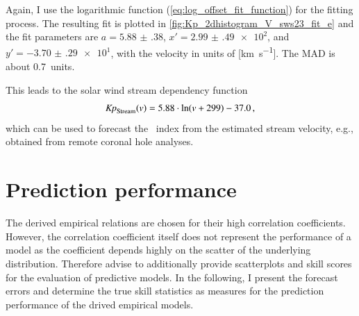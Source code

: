 Again, I use the logarithmic function (\ref{eq:log_offset_fit_function}) for the fitting process. The resulting fit is plotted in \autoref{fig:Kp_2dhistogram_V_sws23_fit_e} and the fit parameters are $a = \num{5.88(38)}$, $x' = \num{2.99(49)e2}$, and $y' = \num{-3.70(29)e1}$, with the velocity in units of [\si{\km\per\s}]. The MAD is about \SI{0.7}{\Kp}~units.
\begin{figure}
\end{figure}
This leads to the solar wind stream dependency function
\begin{align}
	\text{\textit{Kp}}_\text{Stream}(v) = 5.88 \cdot \ln(v + 299) - 37.0	\,,	\label{eq:kpvsv_stream_dependency_function}
\end{align}
which can be used to forecast the \Kp{}~index from the estimated stream velocity, e.g., obtained from remote coronal hole analyses.


\section{Prediction performance}
\label{sec:prediction_performance}
The derived empirical relations are chosen for their high correlation coefficients. However, the correlation coefficient itself does not represent the performance of a model as the coefficient depends highly on the scatter of the underlying distribution. Therefore \citet{Wing2005} advise to additionally provide scatterplots and skill scores for the evaluation of predictive models. In the following, I present the forecast errors and determine the true skill statistics as measures for the prediction performance of the drived empirical models.

